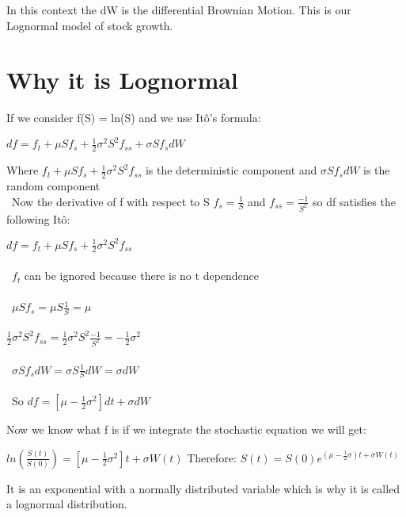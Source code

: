 \documentclass{article}
\begin{document}
In this context the dW is the differential Brownian Motion. This is our Lognormal model of stock growth. 
\newpage
\section{Why it is Lognormal}
If we consider f(S) = ln(S) and we use Itô's formula: 

\begin{center}
$df = f_t+\mu Sf_s +\frac{1}{2}\sigma^2S^2f_{ss} +\sigma Sf_sdW$
\end{center}
Where $f_t+\mu Sf_s +\frac{1}{2}\sigma^2S^2f_{ss}$ is the deterministic component and $\sigma Sf_sdW$ is the random component 
\\\
Now the derivative of f with respect to S $f_s =\frac{1}{S}$ and $f_{ss} =\frac{-1}{S^2}$ so df satisfies the following Itô: 
\begin{center}

 $ df= f_t +\mu S f_s + \frac{1}{2}\sigma^2S^2f_{ss}$ 
\\\
\\\
$f_t$ can be ignored because there is no t dependence 
\\\
\\\ $\mu Sf_s = \mu S \frac{1}{S} = \mu$
\\\
\\
$\frac{1}{2}\sigma^2S^2f_{ss} =\frac{1}
{2}\sigma^2S^2\frac{-1}{S^2} = -\frac{1}{2}\sigma^2 $
\\\
\\\
$\sigma Sf_sdW = \sigma S\frac{1}{S}dW = \sigma dW$
\\\
\\\
So $df = [\mu -\frac{1}{2}\sigma^2 ]dt + \sigma dW$

\end{center}

Now we know what f is if we integrate the stochastic equation we will get: 
\begin{center}

$ln(\frac{S(t)}{S(0)}) =[\mu -\frac{1}{2}\sigma^2 ]t+  \sigma W(t) $
Therefore: $S(t) = S(0)e^{(\mu  -\frac{1}{2}\sigma ) t+ \sigma W(t)}$
\end{center}
It is an exponential with a normally distributed variable which is why it is called a lognormal distribution. 
\end{document}
